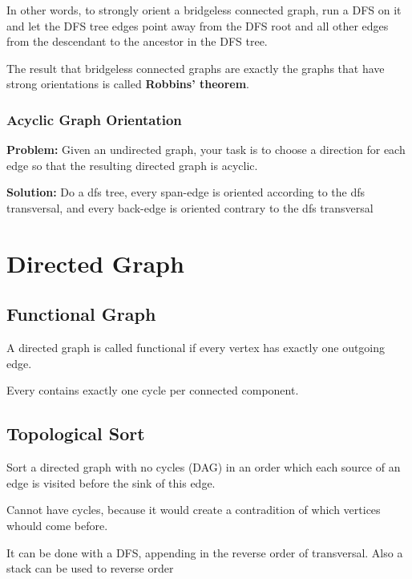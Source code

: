 	In other words, to strongly orient a bridgeless connected graph, 
	run a DFS on it and let the DFS tree edges point away from the DFS root and all other edges 
	from the descendant to the ancestor in the DFS tree.


	The result that bridgeless connected graphs are exactly the graphs that have strong orientations is called \textbf{Robbins' theorem}.

		\subsubsection{Acyclic Graph Orientation}

			\textbf{Problem:} Given an undirected graph, your task is to choose a direction for each edge so that the resulting directed graph is acyclic.

			\textbf{Solution:} Do a dfs tree, every span-edge is oriented according to the dfs transversal,
			and every back-edge is oriented contrary to the dfs transversal


\section{Directed Graph}

	\subsection{Functional Graph}

		A directed graph is called functional if every vertex has exactly one outgoing edge.

		Every  contains exactly one cycle per connected component.

	\subsection{Topological Sort}

	Sort a directed graph with no cycles (DAG) in an order which each source of an edge is visited before the sink of this edge.

	Cannot have cycles, because it would create a contradition of which vertices whould come before.

	It can be done with a DFS, appending in the reverse order of transversal. Also a stack can be used to reverse order	

